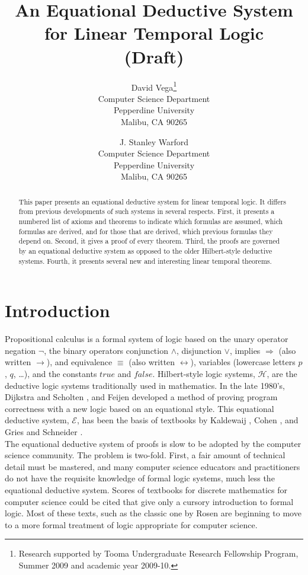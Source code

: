 \documentclass[fleqn, leqno]{article}
\title{An Equational Deductive System\\for Linear Temporal Logic\\(Draft)}
\author{David Vega\thanks{Research supported by Tooma Undergraduate Research Fellowship Program, Summer 2009
and academic year 2009-10.}\\
Computer Science Department\\
Pepperdine University\\
Malibu, CA 90265
\and
J. Stanley Warford\\
Computer Science Department\\
Pepperdine University\\
Malibu, CA 90265}
\date{} %
\newcommand{\impl}{\ensuremath{\Rightarrow}} %
\begin{document}
\maketitle
\begin{abstract}
This paper presents an equational deductive system for linear temporal logic.
It differs from previous developments of such systems in several respects.
First, it presents a numbered list of axioms and theorems to indicate which formulas are assumed, which formulas are
derived, and for those that are derived, which previous formulas they depend on.
Second, it gives a proof of every theorem.
Third, the proofs are governed by an equational deductive system as opposed to the older Hilbert-style deductive systems.
Fourth, it presents several new and interesting linear temporal theorems.\end{abstract}

\thispagestyle{plain}

\section{Introduction}

Propositional calculus is a formal system of logic based on the unary operator negation $\lnot$,
the binary operators conjunction $\land$, disjunction $\lor$, implies $\impl$ (also written $\rightarrow$),
and equivalence $\equiv$ (also written $\leftrightarrow$),
variables (lowercase letters $p$, $q$, \dots), and the constants $true$ and $false$.
Hilbert-style logic systems, $\mathcal{H}$, are the deductive logic systems traditionally used in mathematics.
In the late 1980's, Dijkstra and Scholten \cite{DandS}, and Feijen \cite{Feij} developed a method of proving
program correctness with a new logic based on an equational style.
This equational deductive system, $\mathcal{E}$, has been the basis of textbooks by Kaldewaij \cite{Kald},
Cohen \cite{Cohen}, and Gries and Schneider \cite{LADM}.\\

The equational deductive system of proofs is slow to be adopted by the computer science community.
The problem is two-fold.
First, a fair amount of technical detail must be mastered,
and many computer science educators and practitioners do not have the requisite
knowledge of formal logic systems, much less the equational deductive system.
Scores of textbooks for discrete mathematics for computer science could be cited that give only a cursory introduction to
formal logic. Most of these texts, such as the classic one by Rosen \cite{Rosen} are beginning to move to a more
formal treatment of logic appropriate for computer science.\\
\end{document}
